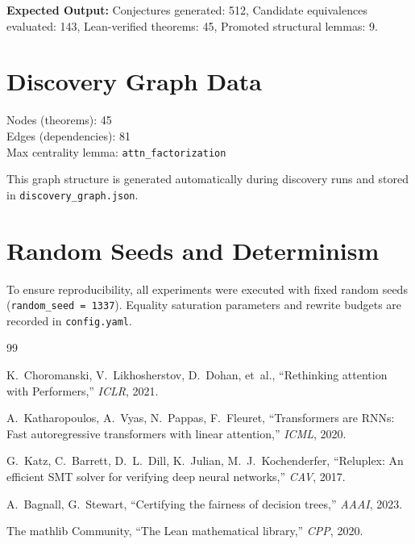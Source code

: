 \documentclass[11pt,a4paper,twocolumn]{article}
\theoremstyle{definition}
\theoremstyle{remark}
\begin{document}
\textbf{Expected Output:}
Conjectures generated: 512, Candidate equivalences evaluated: 143, Lean-verified theorems: 45, Promoted structural lemmas: 9.

\section{Discovery Graph Data}
\label{app:graph}
Nodes (theorems): 45 \\
Edges (dependencies): 81 \\
Max centrality lemma: \texttt{attn\_factorization}

This graph structure is generated automatically during discovery runs and stored in \texttt{discovery\_graph.json}.

\section{Random Seeds and Determinism}
\label{app:seeds}
To ensure reproducibility, all experiments were executed with fixed random seeds (\texttt{random\_seed = 1337}). Equality saturation parameters and rewrite budgets are recorded in \texttt{config.yaml}.

\begin{thebibliography}{99}

K.~Choromanski, V.~Likhosherstov, D.~Dohan, et~al.,
``Rethinking attention with Performers,''
\textit{ICLR}, 2021.

A.~Katharopoulos, A.~Vyas, N.~Pappas, F.~Fleuret,
``Transformers are RNNs: Fast autoregressive transformers with linear
attention,''
\textit{ICML}, 2020.

G.~Katz, C.~Barrett, D.~L.~Dill, K.~Julian, M.~J.~Kochenderfer,
``Reluplex: An efficient SMT solver for verifying deep neural networks,''
\textit{CAV}, 2017.

A.~Bagnall, G.~Stewart,
``Certifying the fairness of decision trees,''
\textit{AAAI}, 2023.

The mathlib Community,
``The Lean mathematical library,''
\textit{CPP}, 2020.

\end{thebibliography}
\end{document}
